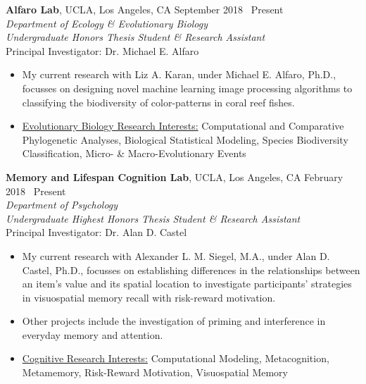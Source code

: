 \documentclass[margin]{res}
\begin{document}
\begin{resume}
		{\bf Alfaro Lab}, UCLA, Los Angeles, CA  \hfill September 2018 \textendash\ Present \\
		{\sl Department of Ecology \& Evolutionary Biology} \\
		{\it Undergraduate Honors Thesis Student \& Research Assistant} \\
		Principal Investigator: Dr. Michael E. Alfaro
		\begin{itemize} \itemsep -2pt
			\item My current research with Liz A. Karan, under Michael E. Alfaro, Ph.D., focusses on designing novel machine learning image processing algorithms to classifying the biodiversity of color-patterns in coral reef fishes. 
			\item \underline{Evolutionary Biology Research Interests:} Computational and Comparative Phylogenetic Analyses, Biological Statistical Modeling, Species Biodiversity Classification, Micro- \& Macro-Evolutionary Events
		\end{itemize}
		
		{\bf Memory and Lifespan Cognition Lab}, UCLA, Los Angeles, CA  \hfill February 2018 \textendash\ Present \\
		{\sl Department of Psychology} \\
		{\it Undergraduate Highest Honors Thesis Student \& Research Assistant} \\
		Principal Investigator: Dr. Alan D. Castel
		\begin{itemize} \itemsep -2pt
			\item My current research with Alexander L. M. Siegel, M.A., under Alan D. Castel, Ph.D., focusses on establishing differences in the relationships between an item's value and its spatial location to investigate participants' strategies in visuospatial memory recall with risk-reward motivation. 
			\item Other projects include the investigation of priming and interference in everyday memory and attention.
			\item \underline{Cognitive Research Interests:} Computational Modeling, Metacognition, Metamemory, Risk-Reward Motivation, Visuospatial Memory
		\end{itemize}
		

\end{resume}
\end{document}
